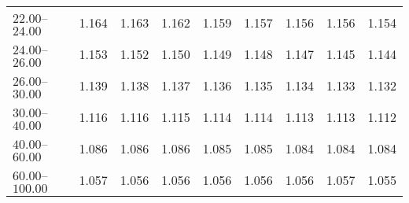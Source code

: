 \begin{table}[htp]
\begin{tiny}
\begin{center}
\begin{tabular}{|l|c|c|c|c|c|c|c|c|}
$22.00$--$24.00$ & 1.164 & 1.163 & 1.162 & 1.159 & 1.157 & 1.156 & 1.156 & 1.154  \\
$24.00$--$26.00$ & 1.153 & 1.152 & 1.150 & 1.149 & 1.148 & 1.147 & 1.145 & 1.144  \\
$26.00$--$30.00$ & 1.139 & 1.138 & 1.137 & 1.136 & 1.135 & 1.134 & 1.133 & 1.132  \\
$30.00$--$40.00$ & 1.116 & 1.116 & 1.115 & 1.114 & 1.114 & 1.113 & 1.113 & 1.112  \\
$40.00$--$60.00$ & 1.086 & 1.086 & 1.086 & 1.085 & 1.085 & 1.084 & 1.084 & 1.084  \\
$60.00$--$100.00$ & 1.057 & 1.056 & 1.056 & 1.056 & 1.056 & 1.056 & 1.057 & 1.055  \\
\hline
\end{tabular} 
             \end{center} 
             \end{tiny} 
             \label{tab:sa_trpm_jpsi} 
             \end{table}


